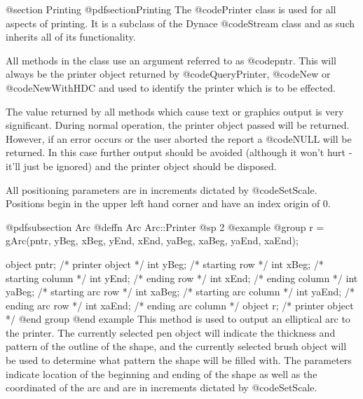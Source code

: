 @section Printing
@pdfsection{Printing}
The @code{Printer} class is used for all aspects of printing.
It is a subclass of the Dynace @code{Stream} class and as
such inherits all of its functionality.

All methods in the class use an argument referred to as @code{pntr}.
This will always be the printer object returned by @code{QueryPrinter},
@code{New} or @code{NewWithHDC} and used to identify the printer
which is to be effected.

The value returned by all methods which cause text or graphics output is
very significant.  During normal operation, the printer object passed
will be returned.  However, if an error occurs or the user aborted the
report a @code{NULL} will be returned.  In this case further output
should be avoided (although it won't hurt - it'll just be ignored) and
the printer object should be disposed.

All positioning parameters are in increments dictated by
@code{SetScale}.  Positions begin in the upper left hand corner and have
an index origin of 0.



















@pdfsubsection {Arc}
@deffn {Arc} Arc::Printer
@sp 2
@example
@group
r = gArc(pntr, yBeg, xBeg, yEnd, xEnd, yaBeg, xaBeg, yaEnd, xaEnd);

object  pntr;   /*  printer object         */
int     yBeg;   /*  starting row           */
int     xBeg;   /*  starting column        */
int     yEnd;   /*  ending row             */
int     xEnd;   /*  ending column          */
int     yaBeg;  /*  starting arc row       */
int     xaBeg;  /*  starting arc column    */
int     yaEnd;  /*  ending arc row         */
int     xaEnd;  /*  ending arc column      */
object  r;      /*  printer object         */
@end group
@end example
This method is used to output an elliptical arc to the printer.  The
currently selected pen object will indicate the thickness and pattern of
the outline of the shape, and the currently selected brush object will
be used to determine what pattern the shape will be filled with.  The
parameters indicate location of the beginning and ending of the shape as
well as the coordinated of the arc and are in increments dictated by
@code{SetScale}.

